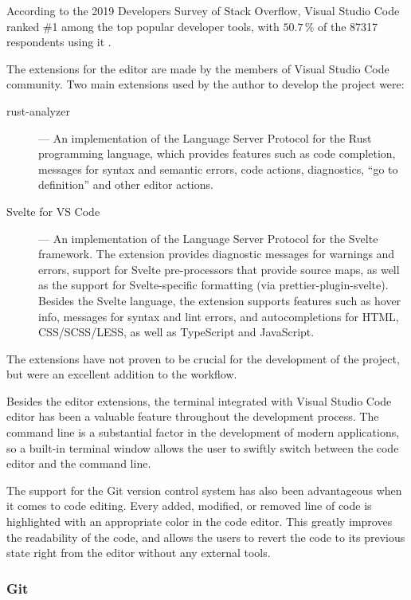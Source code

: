 \documentclass[english,bachelors,forcepolishlogotype]{wizthesis}
\begin{document}
According to the 2019 Developers Survey of Stack Overflow, Visual Studio Code
ranked \#1 among the top popular developer tools, with $50.7\,\%$ of the 87317
respondents using it \cite{stack-overflow-insights-2019}.

The extensions for the editor are made by the members of Visual Studio Code
community. Two main extensions used by the author to develop the project were:
\begin{description}
  \item[rust-analyzer] \cite{rust-analyzer} --- An implementation of the
  Language Server Protocol for the Rust programming language, which provides
  features such as code completion, messages for syntax and semantic errors,
  code actions, diagnostics, ``go to definition'' and other editor actions.
  \item[Svelte for VS Code] \cite{svelte-for-vs-code} --- An implementation of
  the Language Server Protocol for the Svelte framework. The extension provides
  diagnostic messages for warnings and errors, support for Svelte pre-processors
  that provide source maps, as well as the support for Svelte-specific
  formatting (via prettier-plugin-svelte). Besides the Svelte language, the
  extension supports features such as hover info, messages for syntax and lint
  errors, and autocompletions for HTML, CSS/SCSS/LESS, as well as TypeScript and
  JavaScript.
\end{description}
The extensions have not proven to be crucial for the development of the project,
but were an excellent addition to the workflow.

Besides the editor extensions, the terminal integrated with Visual Studio Code
editor has been a valuable feature throughout the development process. The
command line is a substantial factor in the development of modern applications,
so a built-in terminal window allows the user to swiftly switch between the code
editor and the command line.

The support for the Git version control system has also been advantageous when
it comes to code editing. Every added, modified, or removed line of code is
highlighted with an appropriate color in the code editor. This greatly improves
the readability of the code, and allows the users to revert the code to its
previous state right from the editor without any external tools.

\subsubsection*{Git}
\end{document}
